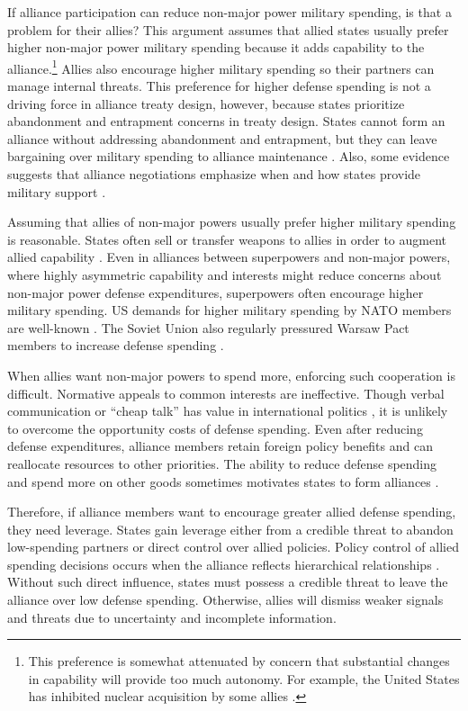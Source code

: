 \documentclass[12pt]{article}
\begin{document}
If alliance participation can reduce non-major power military spending, is that a problem for their allies? 
This argument assumes that allied states usually prefer higher non-major power military spending because it adds capability to the alliance.\footnote{This preference is somewhat attenuated by concern that substantial changes in capability will provide too much autonomy. For example, the United States has inhibited nuclear acquisition by some allies \citep{Gavin2015, Lanoszka2015}.}
Allies also encourage higher military spending so their partners can manage internal threats.
This preference for higher defense spending is not a driving force in alliance treaty design, however, because states prioritize abandonment and entrapment concerns in treaty design. 
States cannot form an alliance without addressing abandonment and entrapment, but they can leave bargaining over military spending to alliance maintenance \citep{Snyder1997}.
Also, some evidence suggests that alliance negotiations emphasize when and how states provide military support \citep{Poast2019a}. 


Assuming that allies of non-major powers usually prefer higher military spending is reasonable. 
States often sell or transfer weapons to allies in order to augment allied capability \citep{Yarhi-Miloetal2016, Pampetal2018}. 
Even in alliances between superpowers and non-major powers, where highly asymmetric capability and interests might reduce concerns about non-major power defense expenditures, superpowers often encourage higher military spending. 
US demands for higher military spending by NATO members are well-known \citep{SchuesslerShifrinson2019}.
The Soviet Union also regularly pressured Warsaw Pact members to increase defense spending \citep{Simon1985}. 


When allies want non-major powers to spend more, enforcing such cooperation is difficult. 
Normative appeals to common interests are ineffective. 
Though verbal communication or ``cheap talk'' has value in international politics \citep{Trager2010}, it is unlikely to overcome the opportunity costs of defense spending. 
Even after reducing defense expenditures, alliance members retain foreign policy benefits and can reallocate resources to other priorities. 
The ability to reduce defense spending and spend more on other goods sometimes motivates states to form alliances \citep{Kimball2010, AllenDigiuseppe2013}. 


Therefore, if alliance members want to encourage greater allied defense spending, they need leverage. 
States gain leverage either from a credible threat to abandon low-spending partners or direct control over allied policies. 
Policy control of allied spending decisions occurs when the alliance reflects hierarchical relationships \citep{Lake1996}. 
Without such direct influence, states must possess a credible threat to leave the alliance over low defense spending. 
Otherwise, allies will dismiss weaker signals and threats due to uncertainty and incomplete information. 
\end{document}

